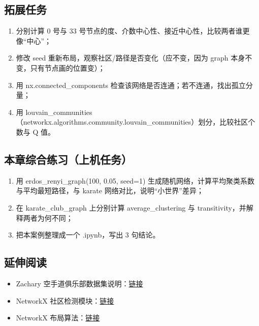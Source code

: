 \subsection{拓展任务}\label{ux62d3ux5c55ux4efbux52a1-6}

\begin{enumerate}
\def\labelenumi{\arabic{enumi}.}
\tightlist
\item
  分别计算 0 号与 33
  号节点的度、介数中心性、接近中心性，比较两者谁更像``中心''；
\item
  修改 seed 重新布局，观察社区/路径是否变化（应不变，因为 graph
  本身不变，只有节点画的位置变）；
\item
  用 nx.connected\_components
  检查该网络是否连通；若不连通，找出孤立分量；
\item
  用
  louvain\_communities（networkx.algorithms.community.louvain\_communities）划分，比较社区个数与
  Q 值。
\end{enumerate}

\subsection{本章综合练习（上机任务）}\label{ux672cux7ae0ux7efcux5408ux7ec3ux4e60ux4e0aux673aux4efbux52a1-2}

\begin{enumerate}
\def\labelenumi{\arabic{enumi}.}
\tightlist
\item
  用 erdos\_renyi\_graph(100, 0.05, seed=1)
  生成随机网络，计算平均聚类系数与平均最短路径，与 karate
  网络对比，说明``小世界''差异；
\item
  在 karate\_club\_graph 上分别计算 average\_clustering 与
  transitivity，并解释两者为何不同；
\item
  把本案例整理成一个 .ipynb，写出 3 句结论。
\end{enumerate}

\subsection{延伸阅读}\label{ux5ef6ux4f38ux9605ux8bfb-29}

\begin{itemize}
\tightlist
\item
  Zachary
  空手道俱乐部数据集说明：\href{https://networkx.org/documentation/stable/reference/generated/networkx.generators.social.karate_club_graph.html}{链接}
\item
  NetworkX
  社区检测模块：\href{https://networkx.org/documentation/stable/reference/algorithms/community.html}{链接}
\item
  NetworkX
  布局算法：\href{https://networkx.org/documentation/stable/reference/drawing.html}{链接}
\end{itemize}

